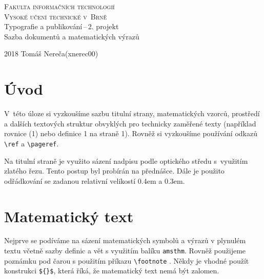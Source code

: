 \documentclass[a4paper, 11pt, twocolumn]{article}
\begin{document}
\begin{titlepage}
\begin{center}
	
	\textsc{\Huge Fakulta informačních technologií\\[3.5mm]
			Vysoké učení technické v~Brně}
	\\[79mm]
	{\LARGE Typografie a publikování\,--\,2. projekt\\[1.5mm]
	Sazba dokumentů a matematických výrazů}
	\vfill
\end{center}
{\Large 2018 \hfill Tomáš Nereča(xnerec00)}
\\[-4mm]
\end{titlepage}

\section*{Úvod}
V~této úloze si vyzkoušíme sazbu titulní strany, matematických vzorců, prostředí a dalších textových struktur obvyklých pro technicky zaměřené texty (například rovnice (1) nebo definice 1 na straně 1). Rovněž si vyzkoušíme používání odkazů \verb|\ref| a \verb|\pageref|.

Na titulní straně je využito sázení nadpisu podle optického středu s~využitím zlatého řezu. Tento postup byl probírán na přednášce. Dále je použito odřádkování se
zadanou relativní velikostí 0.4em a 0.3em.

\section{Matematický text}
Nejprve se podíváme na sázení matematických symbolů a výrazů v plynulém textu včetně sazby definic a vět s využitím balíku \verb|amsthm|. Rovněž použijeme poznámku pod čarou s použitím příkazu \verb|\footnote| . Někdy je vhodné použít konstrukci \verb|${}$|, která říká, že matematický text nemá být zalomen.
\end{document}
